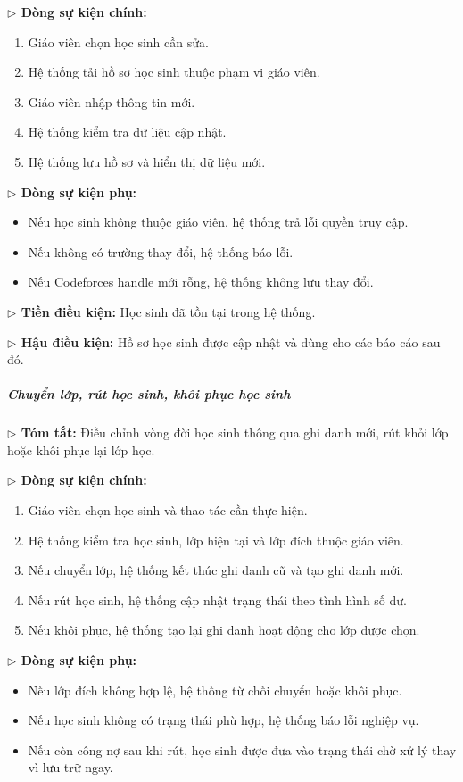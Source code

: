 \documentclass[12pt,a4paper]{article}
\begin{document}
\textbf{$\triangleright$ Dòng sự kiện chính:}
\begin{enumerate}[leftmargin=*]
\item Giáo viên chọn học sinh cần sửa.
\item Hệ thống tải hồ sơ học sinh thuộc phạm vi giáo viên.
\item Giáo viên nhập thông tin mới.
\item Hệ thống kiểm tra dữ liệu cập nhật.
\item Hệ thống lưu hồ sơ và hiển thị dữ liệu mới.
\end{enumerate}

\textbf{$\triangleright$ Dòng sự kiện phụ:}
\begin{itemize}[leftmargin=*]
\item Nếu học sinh không thuộc giáo viên, hệ thống trả lỗi quyền truy cập.
\item Nếu không có trường thay đổi, hệ thống báo lỗi.
\item Nếu Codeforces handle mới rỗng, hệ thống không lưu thay đổi.
\end{itemize}

\textbf{$\triangleright$ Tiền điều kiện:} Học sinh đã tồn tại trong hệ thống.

\textbf{$\triangleright$ Hậu điều kiện:} Hồ sơ học sinh được cập nhật và dùng cho các báo cáo sau đó.

\subparagraph{Chuyển lớp, rút học sinh, khôi phục học sinh}
\textbf{$\triangleright$ Tóm tắt:} Điều chỉnh vòng đời học sinh thông qua ghi danh mới, rút khỏi lớp hoặc khôi phục lại lớp học.

\textbf{$\triangleright$ Dòng sự kiện chính:}
\begin{enumerate}[leftmargin=*]
\item Giáo viên chọn học sinh và thao tác cần thực hiện.
\item Hệ thống kiểm tra học sinh, lớp hiện tại và lớp đích thuộc giáo viên.
\item Nếu chuyển lớp, hệ thống kết thúc ghi danh cũ và tạo ghi danh mới.
\item Nếu rút học sinh, hệ thống cập nhật trạng thái theo tình hình số dư.
\item Nếu khôi phục, hệ thống tạo lại ghi danh hoạt động cho lớp được chọn.
\end{enumerate}

\textbf{$\triangleright$ Dòng sự kiện phụ:}
\begin{itemize}[leftmargin=*]
\item Nếu lớp đích không hợp lệ, hệ thống từ chối chuyển hoặc khôi phục.
\item Nếu học sinh không có trạng thái phù hợp, hệ thống báo lỗi nghiệp vụ.
\item Nếu còn công nợ sau khi rút, học sinh được đưa vào trạng thái chờ xử lý thay vì lưu trữ ngay.
\end{itemize}
\end{document}
